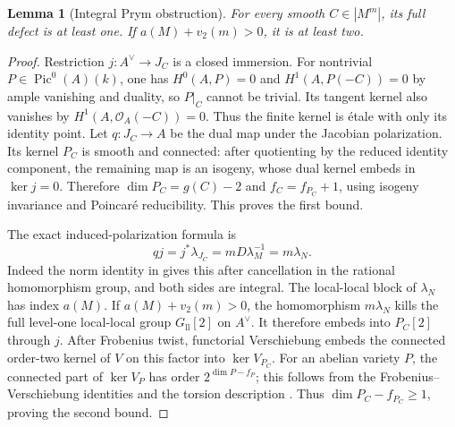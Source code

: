 \documentclass[11pt]{article}
\newtheorem{lemma}[theorem]{Lemma}
\theoremstyle{definition}\newtheorem{definition}[theorem]{Definition}
\theoremstyle{remark}\newtheorem{remark}[theorem]{Remark}
\newcommand{\OO}{\mathcal O}
\newcommand{\Pic}{\operatorname{Pic}}
\begin{document}
\begin{lemma}[Integral Prym obstruction]\label{lem:p10prym}
For every smooth $C\in|M^m|$, its full defect is at least one. If $a(M)+v_2(m)>0$, it is at least two.
\end{lemma}
\begin{proof}
Restriction $j:A^\vee\to J_C$ is a closed immersion. For nontrivial $P\in\Pic^0(A)(k)$, one has $H^0(A,P)=0$ and $H^1(A,P(-C))=0$ by ample vanishing and duality, so $P|_C$ cannot be trivial. Its tangent kernel also vanishes by $H^1(A,\OO_A(-C))=0$. Thus the finite kernel is \'etale with only its identity point. Let $q:J_C\to A$ be the dual map under the Jacobian polarization. Its kernel $P_C$ is smooth and connected: after quotienting by the reduced identity component, the remaining map is an isogeny, whose dual kernel embeds in $\ker j=0$. Therefore $\dim P_C=g(C)-2$ and $f_C=f_{P_C}+1$, using isogeny invariance and Poincar\'e reducibility. This proves the first bound.

The exact induced-polarization formula is
\[
 qj=j^*\lambda_{J_C}=mD\lambda_M^{-1}=m\lambda_N.
\]
Indeed the norm identity in \citet[\S3, equations~(3.2)--(3.3), pp.~346--347]{Debarre} gives this after cancellation in the rational homomorphism group, and both sides are integral. The local-local block of $\lambda_N$ has index $a(M)$. If $a(M)+v_2(m)>0$, the homomorphism $m\lambda_N$ kills the full level-one local-local group $G_{\mathrm{ll}}[2]$ on $A^\vee$. It therefore embeds into $P_C[2]$ through $j$. After Frobenius twist, functorial Verschiebung embeds the connected order-two kernel of $V$ on this factor into $\ker V_{P_C}$. For an abelian variety $P$, the connected part of $\ker V_P$ has order $2^{\dim P-f_P}$; this follows from the Frobenius--Verschiebung identities and the torsion description \citep[Propositions~5.20--5.22, pp.~80--81]{EGM}. Thus $\dim P_C-f_{P_C}\ge1$, proving the second bound.
\end{proof}
\end{document}
